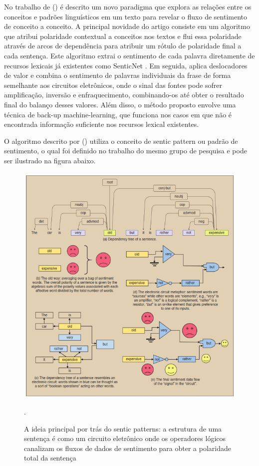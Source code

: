 \documentclass[
	12pt,				%
	openright,			%
	oneside,			%
	a4paper,			%
	english,			%
	spanish,			%
	brazil				%
	]{abntex2}
\begin{document}
	No trabalho de  (\citeyear{article_sentiment_analysis}) é descrito um novo paradigma que explora as relações entre os conceitos e padrões linguísticos em um texto para revelar o fluxo de sentimento de conceito a conceito. A principal novidade do artigo consiste em um algoritmo que atribui polaridade contextual a conceitos nos textos e flui essa polaridade através de arcos de dependência para atribuir um rótulo de polaridade final a cada sentença. Este algoritmo extrai o sentimento de cada palavra diretamente de recursos lexicais já existentes como SenticNet  \cite{Cambria2014}. Em seguida, aplica deslocadores de valor e combina o sentimento de palavras individuais da frase de forma semelhante aos circuitos eletrônicos, onde o sinal das fontes pode sofrer amplificação, inversão e enfraquecimento, combinando-os até obter o resultado final do balanço desses valores. Além disso, o método proposto envolve uma técnica de back-up machine-learning, que funciona nos casos em que não é encontrada informação suficiente nos recursos lexical existentes.

 	O algoritmo descrito por  (\citeyear{article_sentiment_analysis}) utiliza o conceito de sentic pattern ou padrão de sentimento, o qual foi definido no trabalho do mesmo grupo de pesquisa \cite{article_Poria2014} e pode ser ilustrado na figura abaixo.


\begin{figure}[!htb]
\centering
\includegraphics{senticPatternsCircuit}
\caption{A ideia principal por trás do sentic patterns: a estrutura de uma sentença é como um circuito eletrônico onde os operadores lógicos canalizam os fluxos de dados de sentimento para obter a polaridade total da sentença \cite{article_sentiment_analysis}}.
\label{senticPatternsCircuit}
\end{figure}
\end{document}

